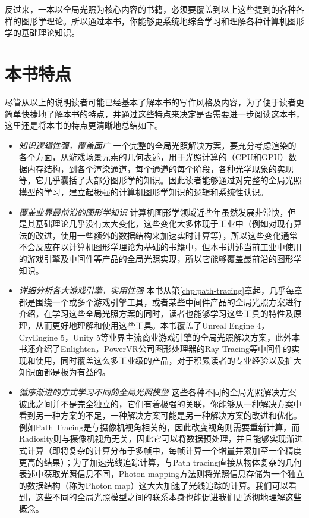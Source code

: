 反过来，一本以全局光照为核心内容的书籍，必须要覆盖到以上这些提到的各种各样的图形学理论。所以通过本书，你能够更系统地综合学习和理解各种计算机图形学的基础理论知识。



\section*{本书特点}
尽管从以上的说明读者可能已经基本了解本书的写作风格及内容，为了便于读者更简单快捷地了解本书的特点，并通过这些特点来决定是否需要进一步阅读这本书，这里还是将本书的特点更清晰地总结如下。

\begin{itemize}
	\item \emph{知识逻辑性强，覆盖面广 } 一个完整的全局光照解决方案，要充分考虑渲染的各个方面，从游戏场景元素的几何表述，用于光照计算的（CPU和GPU）数据内存结构，到各个渲染通道，每个通道的每个阶段，各种光学现象的实现等，它几乎囊括了大部分图形学的知识。因此读者能够通过对完整的全局光照模型的学习，建立起极强的计算机图形学知识的逻辑和系统性认识。
	\item \emph{覆盖业界最前沿的图形学知识 } 计算机图形学领域近些年虽然发展非常快，但是其基础理论几乎没有太大变化，这些变化大多体现于工业中（例如对现有算法的改进，使用一些额外的数据结构来加速实时计算等），所以这些变化通常不会反应在以计算机图形学理论为基础的书籍中，但本书讲述当前工业中使用的游戏引擎及中间件等产品的全局光照实现，所以它能够覆盖最前沿的图形学知识。
	\item \emph{详细分析各大游戏引擎，实用性强 } 本书从第\ref{chp:path-tracing}章起，几乎每章都是围绕一个或多个游戏引擎工具，或者某些中间件产品的全局光照方案进行介绍，在学习这些全局光照方案的同时，读者也能够学习这些工具的特性及原理，从而更好地理解和使用这些工具。本书覆盖了Unreal Engine 4，CryEngine 5，Unity 5等业界主流商业游戏引擎的全局光照解决方案，此外本书还介绍了Enlighten，PowerVR公司图形处理器的Ray Tracing等中间件的实现和使用，同时覆盖这么多工业级的产品，对于积累读者的专业经验以及扩大知识面都是极为有益的。
	\item \emph{循序渐进的方式学习不同的全局光照模型 } 这些各种不同的全局光照解决方案彼此之间并不是完全独立的，它们有着极强的关联，你能够从一种解决方案中看到另一种方案的不足，一种解决方案可能是另一种解决方案的改进和优化。例如Path Tracing是与摄像机视角相关的，因此改变视角则需要重新计算，而Radiosity则与摄像机视角无关，因此它可以将数据预处理，并且能够实现渐进式计算（即将复杂的计算分布于多帧中，每帧计算一个增量并累加至一个精度更高的结果）；为了加速光线追踪计算，与Path tracing直接从物体复杂的几何表述中获取光照信息不同，Photon mapping方法则将光照信息存储为一个独立的数据结构（称为Photon map）这大大加速了光线追踪的计算。我们可以看到，这些不同的全局光照模型之间的联系本身也能促进我们更透彻地理解这些概念。

\end{itemize}
